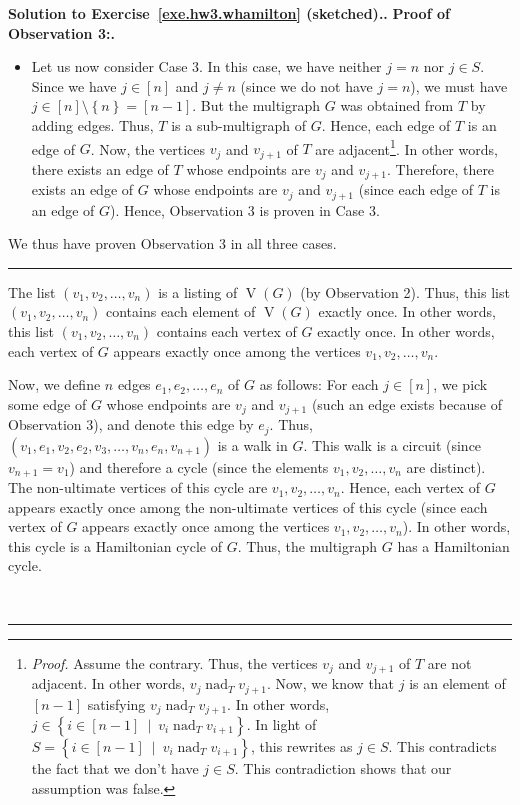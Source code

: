 \documentclass[numbers=enddot,12pt,final,onecolumn,notitlepage]{scrartcl}%
\theoremstyle{definition}
\newenvironment{proof}[1][Proof]{\noindent\textbf{#1.} }{\ \rule{0.5em}{0.5em}}
\newcommand{\set}[1]{\left\{ #1 \right\}}
\newcommand{\tup}[1]{\left( #1 \right)}
\newcommand{\ive}[1]{\left[ #1 \right]}
\newcommand{\verts}[1]{\operatorname{V}\left( #1 \right)}
\begin{document}
\begin{proof}[Solution to Exercise~\ref{exe.hw3.whamilton}
(sketched).]
\begin{proof}[Proof of Observation 3:]
\begin{itemize}
\item Let us now consider Case 3.
      In this case, we have neither $j = n$ nor $j \in S$.
      Since we have $j \in \ive{n}$ and $j \neq n$ (since we do not
      have $j = n$), we must have
      $j \in \ive{n} \setminus \set{n} = \ive{n-1}$.
      But the multigraph $G$ was obtained from $T$ by adding edges.
      Thus, $T$ is a sub-multigraph of $G$.
      Hence, each edge of $T$ is an edge of $G$.
      Now, the vertices $v_j$ and $v_{j+1}$ of $T$ are
      adjacent\footnote{\textit{Proof.} Assume the contrary.
        Thus, the vertices $v_j$ and $v_{j+1}$ of $T$ are not
        adjacent.
        In other words, $v_j \operatorname{nad}_T v_{j+1}$.
        Now, we know that $j$ is an element of $\ive{n-1}$ satisfying
        $v_j \operatorname{nad}_T v_{j+1}$.
        In other words,
        $j \in \set{i \in \ive{n-1} \ \mid \ v_i \operatorname{nad}_T v_{i+1} }$.
        In light of
        $S = \set{i \in \ive{n-1} \ \mid \ v_i \operatorname{nad}_T v_{i+1} }$,
        this rewrites as $j \in S$.
        This contradicts the fact that we don't have $j \in S$.
        This contradiction shows that our assumption was false.}.
      In other words, there exists an edge of $T$ whose endpoints are
      $v_j$ and $v_{j+1}$.
      Therefore, there exists an edge of $G$ whose endpoints are
      $v_j$ and $v_{j+1}$
      (since each edge of $T$ is an edge of $G$).
      Hence, Observation 3 is proven in Case 3.
\end{itemize}

We thus have proven Observation 3 in all three cases.
\end{proof}

The list $\tup{v_1, v_2, \ldots, v_n}$ is a listing of
$\verts{G}$ (by Observation 2).
Thus, this list $\tup{v_1, v_2, \ldots, v_n}$ contains each element
of $\verts{G}$ exactly once.
In other words, this list $\tup{v_1, v_2, \ldots, v_n}$ contains each
vertex of $G$ exactly once.
In other words, each vertex of $G$ appears exactly once among the
vertices $v_1, v_2, \ldots, v_n$.

Now, we define $n$ edges $e_1, e_2, \ldots, e_n$ of $G$ as follows:
For each $j \in \ive{n}$, we pick some edge of $G$ whose endpoints are
$v_j$ and $v_{j+1}$ (such an edge exists because of Observation 3),
and denote this edge by $e_j$.
Thus, $\tup{v_1, e_1, v_2, e_2, v_3, \ldots, v_n, e_n, v_{n+1}}$ is a
walk in $G$.
This walk is a circuit (since $v_{n+1} = v_1$) and therefore a cycle
(since the elements $v_1, v_2, \ldots, v_n$ are distinct).
The non-ultimate vertices of this cycle are $v_1, v_2, \ldots, v_n$.
Hence, each vertex of $G$ appears exactly once among the non-ultimate
vertices of this cycle (since each vertex of $G$ appears exactly once
among the vertices $v_1, v_2, \ldots, v_n$).
In other words, this cycle is a Hamiltonian cycle of $G$.
Thus, the multigraph $G$ has a Hamiltonian cycle.


\end{proof}
\end{document}
